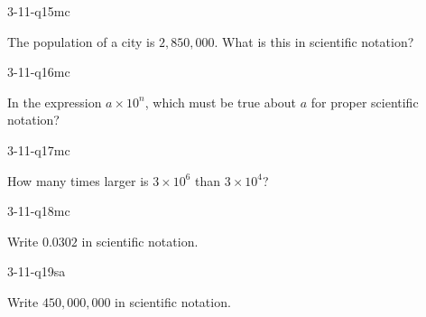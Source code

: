 \begin{practiceQuestion}{3-11-q15}{mc}
\begin{questionText}
The population of a city is $2{,}850{,}000$. What is this in scientific notation?
\end{questionText}
\end{practiceQuestion}

\begin{practiceQuestion}{3-11-q16}{mc}
\begin{questionText}
In the expression $a \times 10^n$, which must be true about $a$ for proper scientific notation?
\end{questionText}
\end{practiceQuestion}

\begin{practiceQuestion}{3-11-q17}{mc}
\begin{questionText}
How many times larger is $3 \times 10^6$ than $3 \times 10^4$?
\end{questionText}
\end{practiceQuestion}

\begin{practiceQuestion}{3-11-q18}{mc}
\begin{questionText}
Write $0.0302$ in scientific notation.
\end{questionText}
\end{practiceQuestion}


\begin{practiceQuestion}{3-11-q19}{sa}
\begin{questionText}
Write $450{,}000{,}000$ in scientific notation.
\end{questionText}
\end{practiceQuestion}

